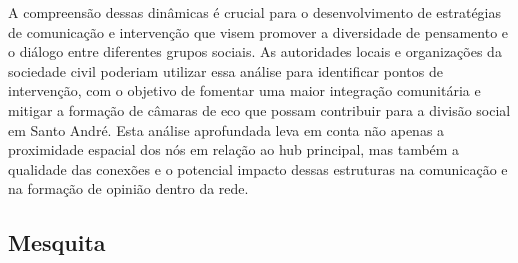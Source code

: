 A compreensão dessas dinâmicas é crucial para o desenvolvimento de estratégias de comunicação e intervenção que visem promover a diversidade de pensamento e o diálogo entre diferentes grupos sociais. As autoridades locais e organizações da sociedade civil poderiam utilizar essa análise para identificar pontos de intervenção, com o objetivo de fomentar uma maior integração comunitária e mitigar a formação de câmaras de eco que possam contribuir para a divisão social em Santo André. Esta análise aprofundada leva em conta não apenas a proximidade espacial dos nós em relação ao hub principal, mas também a qualidade das conexões e o potencial impacto dessas estruturas na comunicação e na formação de opinião dentro da rede.

\subsection{Mesquita}

